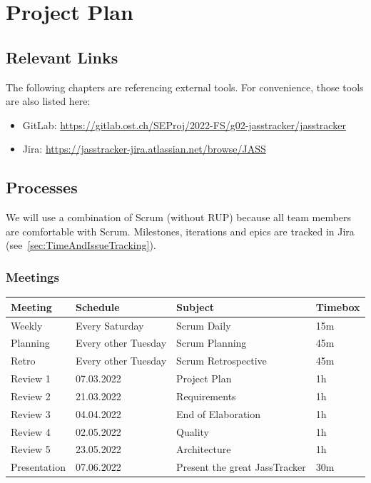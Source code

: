 \chapter{Project Plan}

\section{Relevant Links}

The following chapters are referencing external tools.
For convenience, those tools are also listed here:

\begin{itemize}
    \item GitLab: \url{https://gitlab.ost.ch/SEProj/2022-FS/g02-jasstracker/jasstracker}
    \item Jira: \url{https://jasstracker-jira.atlassian.net/browse/JASS}
\end{itemize}

\section{Processes}

We will use a combination of Scrum (without RUP) because all team members are comfortable with Scrum.
Milestones, iterations and epics are tracked in Jira (see~\ref{sec:TimeAndIssueTracking}).

\subsection*{Meetings}

\begin{table}[H]
    \begin{tabular}{l|l|l|l}
    \textbf{Meeting} & \textbf{Schedule} & \textbf{Subject} & \textbf{Timebox} \\
    \hline
    Weekly & Every Saturday & Scrum Daily & 15m \\
    Planning & Every other Tuesday & Scrum Planning & 45m \\
    Retro & Every other Tuesday & Scrum Retrospective & 45m \\
    Review 1 & 07.03.2022 & Project Plan & 1h \\
    Review 2 & 21.03.2022 & Requirements & 1h \\
    Review 3 & 04.04.2022 & End of Elaboration & 1h \\
    Review 4 & 02.05.2022 & Quality & 1h \\
    Review 5 & 23.05.2022 & Architecture & 1h \\
    Presentation & 07.06.2022 & Present the great JassTracker & 30m
    \end{tabular}
\end{table}

